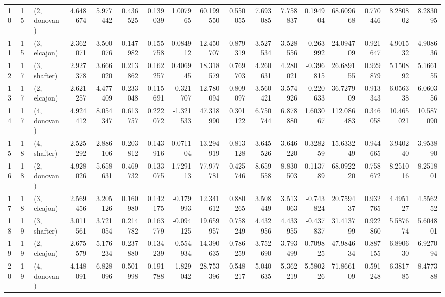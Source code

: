 \begin{tabular}{lllrrrrrrrrrrrrrr}
10 &    15 &  (2, donovan) &  4.648674 &  5.977442 &   0.436525 &  0.139039 &  1.007965 &  60.199550 &  0.550055 &   7.693085 &  7.758837 &  0.194904 &   68.609668 &  0.770446 &   8.280802 &   8.283095 \\
11 &    15 &  (3, elcajon) &  2.362071 &  3.500076 &   0.147982 &  0.155758 &  0.084912 &  12.450707 &  0.879319 &   3.527534 &  3.528556 & -0.263992 &   24.094709 &  0.921647 &   4.901532 &   4.908636 \\
12 &    17 &  (3, shafter) &  2.927378 &  3.666020 &   0.213862 &  0.162257 &  0.406945 &  18.318579 &  0.769703 &   4.260631 &  4.280021 & -0.396815 &   26.689155 &  0.929879 &   5.150892 &   5.166155 \\
13 &    17 &  (2, elcajon) &  2.621257 &  4.477409 &   0.233048 &  0.115691 & -0.321707 &  12.780094 &  0.809097 &   3.560421 &  3.574926 & -0.220633 &   36.727909 &  0.913343 &   6.056338 &   6.060356 \\
14 &    17 &  (4, donovan) &  4.924412 &  8.054347 &   0.613757 &  0.222072 & -1.321533 &  47.318990 &  0.301122 &   6.750744 &  6.878880 &  1.603067 &  112.086483 &  0.346058 &  10.465021 &  10.587090 \\
15 &    18 &  (4, shafter) &  2.525292 &  2.886106 &   0.203812 &  0.143916 &  0.071104 &  13.294919 &  0.813128 &   3.645526 &  3.646220 &  0.328259 &   15.633249 &  0.944665 &   3.940240 &   3.953890 \\
16 &    18 &  (2, donovan) &  4.928026 &  5.658631 &   0.469732 &  0.133075 &  1.729113 &  77.977781 &  0.425746 &   8.659558 &  8.830503 &  0.113789 &   68.092220 &  0.758672 &   8.251016 &   8.251801 \\
17 &    18 &  (3, elcajon) &  2.569456 &  3.205126 &   0.160980 &  0.142175 & -0.179993 &  12.341612 &  0.880265 &   3.508449 &  3.513063 & -0.743824 &   20.759437 &  0.932765 &   4.495127 &   4.556252 \\
18 &    19 &  (3, shafter) &  3.011561 &  3.721054 &   0.214782 &  0.163779 & -0.094125 &  19.659957 &  0.758249 &   4.432956 &  4.433955 & -0.437837 &   31.413799 &  0.922860 &   5.587674 &   5.604801 \\
19 &    19 &  (2, elcajon) &  2.675579 &  5.176234 &   0.237880 &  0.134239 & -0.554934 &  14.390635 &  0.786259 &   3.752690 &  3.793499 &  0.709825 &   47.984634 &  0.887155 &   6.890630 &   6.927094 \\
20 &    19 &  (4, donovan) &  4.148091 &  6.828096 &   0.501998 &  0.191788 & -1.829042 &  28.753396 &  0.548217 &   5.040635 &  5.362219 &  5.580226 &   71.866109 &  0.591248 &   6.381785 &   8.477388 \\

\end{tabular}
